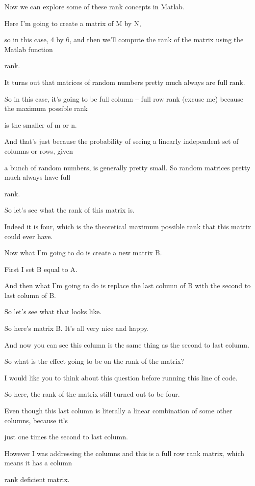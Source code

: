 \documentclass[fleqn,10pt]{olplainarticle}
\theoremstyle{definition}
\theoremstyle{remark}
\begin{document}
Now we can explore some of these rank concepts in Matlab.

Here I'm going to create a matrix of M by N,

so in this case, 4 by 6, and then we'll compute the rank of the matrix using the Matlab function

rank.

It turns out that matrices of random numbers pretty much always are full rank.

So in this case, it's going to be full column -- full row rank (excuse me) because the maximum possible rank

is the smaller of m or n.

And that's just because the probability of seeing a linearly independent set of columns or rows, given

a bunch of random numbers, is generally pretty small. So random matrices pretty much always have full

rank.

So let's see what the rank of this matrix is.

Indeed it is four, which is the theoretical maximum possible rank that this matrix could ever have.

Now what I'm going to do is create a new matrix B.

First I set B equal to A.

And then what I'm going to do is replace the last column of B with the second to last column of B.

So let's see what that looks like.

So here's matrix B. It's all very nice and happy.

And now you can see this column is the same thing as the second to last column.

So what is the effect going to be on the rank of the matrix?

I would like you to think about this question before running this line of code.

So here, the rank of the matrix still turned out to be four.

Even though this last column is literally a linear combination of some other columns, because it's

just one times the second to last column.

However I was addressing the columns and this is a full row rank matrix, which means it has a column

rank deficient matrix.
\end{document}

